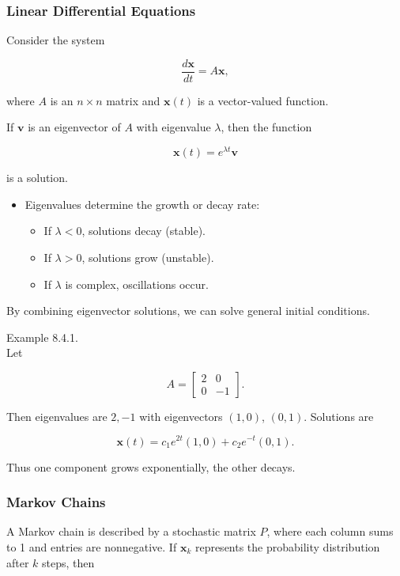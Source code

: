 \documentclass[
  12pt,
  a4paper,
]{article}
\begin{document}
\subsubsection{Linear Differential
Equations}\label{linear-differential-equations}

Consider the system

\[\frac{d\mathbf{x}}{dt} = A \mathbf{x},\]

where \(A\) is an \(n \times n\) matrix and \(\mathbf{x}(t)\) is a
vector-valued function.

If \(\mathbf{v}\) is an eigenvector of \(A\) with eigenvalue
\(\lambda\), then the function

\[\mathbf{x}(t) = e^{\lambda t}\mathbf{v}\]

is a solution.

\begin{itemize}
\item
  Eigenvalues determine the growth or decay rate:

  \begin{itemize}
  \item
    If \(\lambda < 0\), solutions decay (stable).
  \item
    If \(\lambda > 0\), solutions grow (unstable).
  \item
    If \(\lambda\) is complex, oscillations occur.
  \end{itemize}
\end{itemize}

By combining eigenvector solutions, we can solve general initial
conditions.

Example 8.4.1.\\
Let

\[A = \begin{bmatrix} 2 & 0 \\ 0 & -1 \end{bmatrix}.\]

Then eigenvalues are \(2, -1\) with eigenvectors \((1,0)\), \((0,1)\).
Solutions are

\[\mathbf{x}(t) = c_1 e^{2t}(1,0) + c_2 e^{-t}(0,1).\]

Thus one component grows exponentially, the other decays.

\subsubsection{Markov Chains}\label{markov-chains}

A Markov chain is described by a stochastic matrix \(P\), where each
column sums to 1 and entries are nonnegative. If \(\mathbf{x}_k\)
represents the probability distribution after \(k\) steps, then
\end{document}
